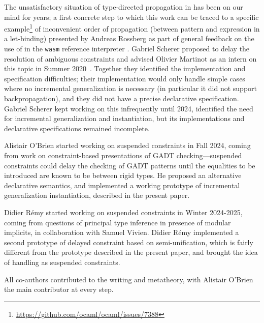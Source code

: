 \documentclass[acmsmall,screen,nonacm%
\Anonymous{,anonymous}{}%
\Final{}{,review}%
]{acmart}
\providecommand{\DIFdel}[1]{\protect\cbdelete{\protect\color{red}#1}\protect\cbdelete} %
\providecommand{\DIFaddbegin}{} %
\providecommand{\DIFaddend}{} %
\providecommand{\DIFdelbegin}{} %
\providecommand{\DIFdelend}{} %
\begin{document}
\begin{version}{\Acknowledgments}

The unsatisfactory situation of type-directed propagation in \OCaml has
been on our mind for years; a first concrete step to which this work
can be traced to a specific
example\footnote{\url{https://github.com/ocaml/ocaml/issues/7388}} of
inconvenient order of propagation (between pattern and expression in
a let-binding) presented by Andreas Rossberg as part of general
feedback on the use of \OCaml in the \texttt{wasm} reference
interpreter \citep*{rossberg-wasm}. Gabriel Scherer proposed to delay
the resolution of ambiguous constraints and advised Olivier Martinot
as an intern on this topic in Summer
2020~\citep*{frozen-constraints-2021}. Together they
identified the implementation and specification difficulties; their
implementation would only handle simple cases where no incremental
generalization is necessary (in particular it did not support
backpropagation), and they did not have a precise declarative
specification. Gabriel Scherer kept working on this infrequently until
2024, identified the need for incremental generalization and
instantiation, but its implementations and declarative specifications
remained incomplete.

Alistair O'Brien started working on suspended constraints in Fall
2024, coming from work on constraint-based presentations of GADT
checking---suspended constraints could delay the checking of GADT
patterns until the equalities to be introduced are known to be between
rigid types. He proposed an alternative declarative semantics,
and implemented a working prototype of incremental generalization
instantiation, described in the present paper.

Didier R\'emy started working on suspended constraints in Winter
2024-2025, coming from questions of principal type inference in
presence of modular implicits, in collaboration with Samuel
Vivien. Didier R\'emy implemented a second prototype of delayed
constraint based on semi-unification, which is fairly different from
the prototype described in the present paper, and brought the idea of
handling \DIFdelbegin \DIFdel{polytypes }\DIFdelend \DIFaddbegin \polytypes \DIFaddend as suspended constraints.

All co-authors contributed to the writing and metatheory, with
Alistair O'Brien the main contributor at every step.
\end{version}
\end{document}
